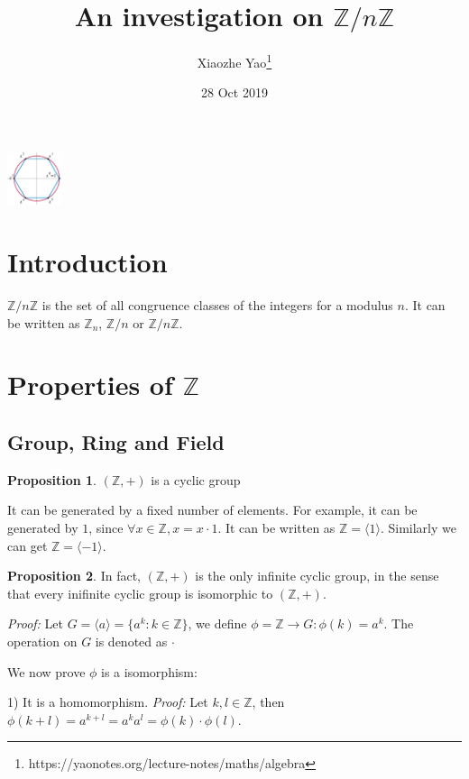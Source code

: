 \documentclass{article}
\title{An investigation on $\mathbb{Z}/n\mathbb{Z}$}
\author{Xiaozhe Yao\footnote{https://yaonotes.org/lecture-notes/maths/algebra}}
\date{28 Oct 2019}
\theoremstyle{definition}
\newtheorem{proposition}{Proposition}[section]
\begin{document}
\maketitle
\begin{center}
    \includegraphics[width=60px]{Algebra/images/cyclic_group.pdf}
\end{center}
\section{Introduction}
$\mathbb{Z}/n\mathbb{Z}$ is the set of all congruence classes of the integers for a modulus $n$. It can be written as $\mathbb{Z}_n$, $\mathbb{Z}/n$ or $\mathbb{Z}/n\mathbb{Z}$. 

\section{Properties of $\mathbb{Z}$}

\subsection{Group, Ring and Field}

\begin{proposition}
$(\mathbb{Z},+)$ is a cyclic group
\end{proposition}

It can be generated by a fixed number of elements. For example, it can be generated by $1$, since $\forall x \in \mathbb{Z}, x = x \cdot 1$. It can be written as $\mathbb{Z}=\langle1\rangle$. Similarly we can get $\mathbb{Z}=\langle-1\rangle$. 

\begin{proposition}
In fact, $(\mathbb{Z},+)$ is the only infinite cyclic group, in the sense that every inifinite cyclic group is isomorphic to $(\mathbb{Z},+)$.
\end{proposition}

\textit{Proof:} Let $G=\langle a \rangle = \{a^k: k \in \mathbb{Z}\}$, we define $\phi = \mathbb{Z} \to G: \phi(k)=a^k$. The operation on $G$ is denoted as $\cdot$

We now prove $\phi$ is a isomorphism:

1) It is a homomorphism. \textit{Proof:} Let $k,l \in \mathbb{Z}$, then $\phi(k+l)=a^{k+l}=a^ka^l = \phi(k) \cdot \phi(l)$.
\end{document}
